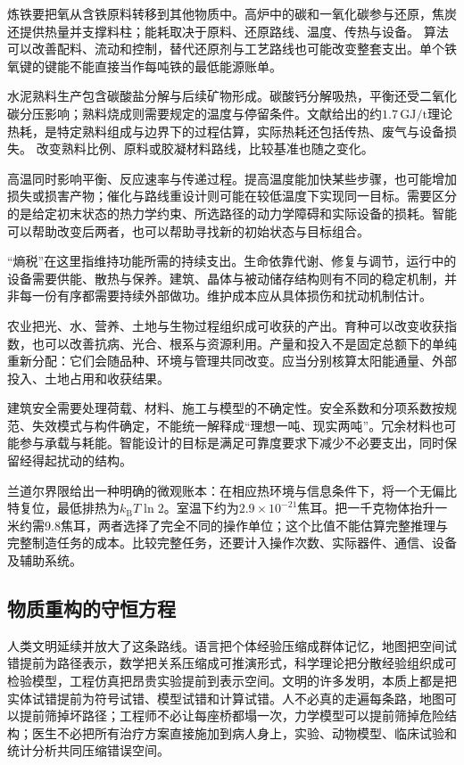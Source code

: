 炼铁要把氧从含铁原料转移到其他物质中。高炉中的碳和一氧化碳参与还原，焦炭还提供热量并支撑料柱；能耗取决于原料、还原路线、温度、传热与设备。\cite{babich2021blast} 算法可以改善配料、流动和控制，替代还原剂与工艺路线也可能改变整套支出。单个铁氧键的键能不能直接当作每吨铁的最低能源账单。

水泥熟料生产包含碳酸盐分解与后续矿物形成。碳酸钙分解吸热，平衡还受二氧化碳分压影响；熟料烧成则需要规定的温度与停留条件。文献给出的约$1.7\,\mathrm{GJ/t}$理论热耗，是特定熟料组成与边界下的过程估算，实际热耗还包括传热、废气与设备损失。\cite{madivate1999theoretical,madlool2011cement} 改变熟料比例、原料或胶凝材料路线，比较基准也随之变化。

高温同时影响平衡、反应速率与传递过程。提高温度能加快某些步骤，也可能增加损失或损害产物；催化与路线重设计则可能在较低温度下实现同一目标。需要区分的是给定初末状态的热力学约束、所选路径的动力学障碍和实际设备的损耗。智能可以帮助改变后两者，也可以帮助寻找新的初始状态与目标组合。


“熵税”在这里指维持功能所需的持续支出。生命依靠代谢、修复与调节，运行中的设备需要供能、散热与保养。建筑、晶体与被动储存结构则有不同的稳定机制，并非每一份有序都需要持续外部做功。维护成本应从具体损伤和扰动机制估计。

农业把光、水、营养、土地与生物过程组织成可收获的产出。育种可以改变收获指数，也可以改善抗病、光合、根系与资源利用。产量和投入不是固定总额下的单纯重新分配：它们会随品种、环境与管理共同改变。应当分别核算太阳能通量、外部投入、土地占用和收获结果。

建筑安全需要处理荷载、材料、施工与模型的不确定性。安全系数和分项系数按规范、失效模式与构件确定，不能统一解释成“理想一吨、现实两吨”。冗余材料也可能参与承载与耗能。智能设计的目标是满足可靠度要求下减少不必要支出，同时保留经得起扰动的结构。

兰道尔界限给出一种明确的微观账本：在相应热环境与信息条件下，将一个无偏比特复位，最低排热为$k_{\mathrm B}T\ln2$。室温下约为$2.9\times10^{-21}$焦耳。把一千克物体抬升一米约需9.8焦耳，两者选择了完全不同的操作单位；这个比值不能估算完整推理与完整制造任务的成本。比较完整任务，还要计入操作次数、实际器件、通信、设备及辅助系统。

\subsection{物质重构的守恒方程}


人类文明延续并放大了这条路线。语言把个体经验压缩成群体记忆，地图把空间试错提前为路径表示，数学把关系压缩成可推演形式，科学理论把分散经验组织成可检验模型，工程仿真把昂贵实验提前到表示空间。文明的许多发明，本质上都是把实体试错提前为符号试错、模型试错和计算试错。人不必真的走遍每条路，地图可以提前筛掉坏路径；工程师不必让每座桥都塌一次，力学模型可以提前筛掉危险结构；医生不必把所有治疗方案直接施加到病人身上，实验、动物模型、临床试验和统计分析共同压缩错误空间。

